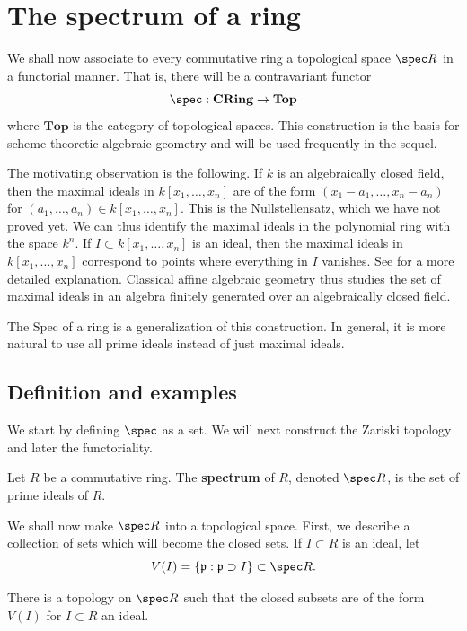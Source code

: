 \section{The spectrum of a ring}

We shall now associate to every commutative ring a topological
space $\spec R$
in a functorial manner.
That is, there will be a contravariant functor
\[\spec:  \mathbf{CRing} \to \mathbf{Top}  \]
where $\mathbf{Top}$ is the category of topological spaces.
This construction is the basis for scheme-theoretic
algebraic geometry and will be used frequently in the sequel. 

The motivating observation is the following. If $k$ is an algebraically closed
field, then the maximal ideals in $k[x_1, \dots, x_n]$ are of the form
$(x_1-a_1, \dots, x_n  - a_n)$ for $(a_1, \dots, a_n) \in k[x_1, \dots, x_n]$.
This is the Nullstellensatz, which we have not proved yet. We can thus
identify the maximal ideals in the polynomial ring with the space $k^n$.
If $I \subset k[x_1, \dots, x_n]$ is an ideal, then the maximal ideals in
$k[x_1,\dots,x_n]$ correspond to points where everything in $I$ vanishes. See 
 for a more detailed explanation. Classical affine algebraic
geometry thus studies the set of maximal ideals in an algebra finitely
generated over an algebraically closed field.

The $\mathrm{Spec}$ of a ring is a generalization of this construction.
In general, it is more natural to 
use all prime ideals instead of just maximal ideals.
\subsection{Definition and examples}

We start by defining $\spec$ as a set. We will next
construct the
Zariski topology and later the functoriality.
\begin{definition} 
Let $R$ be a commutative ring. The \textbf{spectrum} of $R$,
denoted $\spec R$, is
the set of prime ideals of $R$.
\end{definition} 

We shall now make $\spec R$ into a topological space. First, we
describe a
collection of sets which will become the closed sets. 
If $I \subset R$ is an ideal, let
\[ V(I) = \left\{\mathfrak{p}: \mathfrak{p} \supset I\right\}
\subset \spec R.
\]

\begin{proposition} 
There is a topology on $\spec R$ such that the closed subsets
are of the form
$V(I)$ for $I \subset R$ an ideal.
\end{proposition} 

